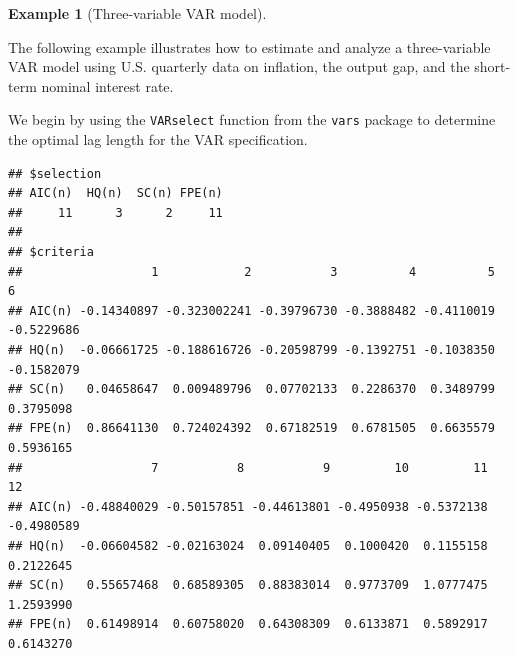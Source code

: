 \documentclass[
  12pt,
]{book}
\newenvironment{Shaded}{\begin{snugshade}}{\end{snugshade}}
\newcommand{\AttributeTok}[1]{\textcolor[rgb]{0.13,0.29,0.53}{#1}}
\newcommand{\CommentTok}[1]{\textcolor[rgb]{0.56,0.35,0.01}{\textit{#1}}}
\newcommand{\DecValTok}[1]{\textcolor[rgb]{0.00,0.00,0.81}{#1}}
\newcommand{\FunctionTok}[1]{\textcolor[rgb]{0.13,0.29,0.53}{\textbf{#1}}}
\newcommand{\NormalTok}[1]{#1}
\newcommand{\OtherTok}[1]{\textcolor[rgb]{0.56,0.35,0.01}{#1}}
\newcommand{\SpecialCharTok}[1]{\textcolor[rgb]{0.81,0.36,0.00}{\textbf{#1}}}
\newcommand{\StringTok}[1]{\textcolor[rgb]{0.31,0.60,0.02}{#1}}
\theoremstyle{definition}
\theoremstyle{definition}
\newtheorem{example}{Example}[chapter]
\theoremstyle{definition}
\theoremstyle{definition}
\theoremstyle{remark}
\begin{document}
\begin{example}[Three-variable VAR model]
\protect\hypertarget{exm:US3varselect}{}\label{exm:US3varselect}

The following example illustrates how to estimate and analyze a three-variable VAR model using U.S. quarterly data on inflation, the output gap, and the short-term nominal interest rate.

We begin by using the \texttt{VARselect} function from the \texttt{vars} package to determine the optimal lag length for the VAR specification.

\begin{Shaded}
\end{Shaded}

\begin{verbatim}
## $selection
## AIC(n)  HQ(n)  SC(n) FPE(n) 
##     11      3      2     11 
## 
## $criteria
##                  1            2           3          4          5          6
## AIC(n) -0.14340897 -0.323002241 -0.39796730 -0.3888482 -0.4110019 -0.5229686
## HQ(n)  -0.06661725 -0.188616726 -0.20598799 -0.1392751 -0.1038350 -0.1582079
## SC(n)   0.04658647  0.009489796  0.07702133  0.2286370  0.3489799  0.3795098
## FPE(n)  0.86641130  0.724024392  0.67182519  0.6781505  0.6635579  0.5936165
##                  7           8           9         10         11         12
## AIC(n) -0.48840029 -0.50157851 -0.44613801 -0.4950938 -0.5372138 -0.4980589
## HQ(n)  -0.06604582 -0.02163024  0.09140405  0.1000420  0.1155158  0.2122645
## SC(n)   0.55657468  0.68589305  0.88383014  0.9773709  1.0777475  1.2593990
## FPE(n)  0.61498914  0.60758020  0.64308309  0.6133871  0.5892917  0.6143270
\end{verbatim}


\end{example}
\end{document}
